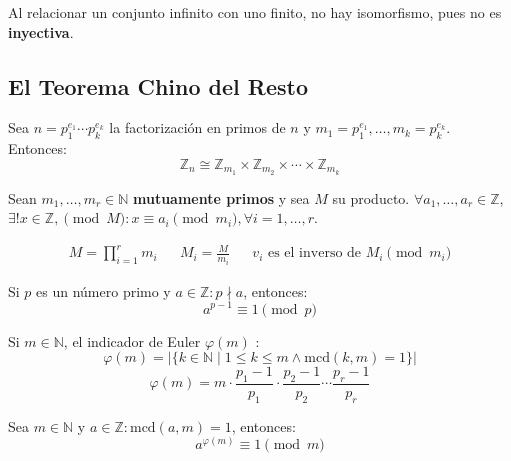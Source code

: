 \documentclass[12pt]{article}
\begin{document}
\begin{tcolorbox}[colback=yellow!15, title=Nota]
    Al relacionar un conjunto infinito con uno finito, no hay isomorfismo, pues no es \textbf{inyectiva}.
\end{tcolorbox}

\newpage

\subsection*{El Teorema Chino del Resto}

\begin{tcolorbox}[title=Isomorfismo]
Sea \( n = p_1^{e_1} \cdots p_k^{e_k} \) la factorización en primos de \( n \) y \( m_1 = p_1^{e_1}, \dots, m_k = p_k^{e_k} \). Entonces:
\[
\mathbb{Z}_n \cong \mathbb{Z}_{m_1} \times \mathbb{Z}_{m_2} \times \cdots \times \mathbb{Z}_{m_k}
\]
\end{tcolorbox}

\begin{tcolorbox}[title=Teorema Chino del Resto]
Sean \(m_1, \dots, m_r \in \mathbb{N}\) \textbf{mutuamente primos} y sea \(M\) su producto.
\( \forall a_1, \dots, a_r \in \mathbb{Z} \), \( \exists ! x \in \mathbb{Z}, \pmod{M} : x \equiv a_i \pmod{m_i}, \forall i = 1, \dots, r \).
\end{tcolorbox}

\begin{tcolorbox}[colback=yellow!15, title=Nota]
\begin{align*}
    M = \prod_{i=1}^r m_i && M_i = \frac{M}{m_i} && v_i \text{ es el inverso de } M_i \pmod{m_i}
\end{align*}
\end{tcolorbox}

\begin{tcolorbox}[title=Teorema de Fermat]    
Si \( p \) es un número primo y \( a \in \mathbb{Z} : p \nmid a \), entonces:
\[
a^{p-1} \equiv 1 \pmod{p}
\]
\end{tcolorbox}

\begin{tcolorbox}[title= Indicador de Euler]    
Si \( m \in \mathbb{N} \), el indicador de Euler \( \varphi(m) \) :
\[ \varphi(m) = |\{k \in \mathbb{N} \mid 1 \le k \le m \land \text{mcd}(k, m) = 1\}| \]
\[
    \varphi(m) = m \cdot \frac{p_1 - 1}{p_1} \cdot \frac{p_2 - 1}{p_2} \cdots \frac{p_r - 1}{p_r}
\]
\end{tcolorbox}

\begin{tcolorbox}[title= Teorema de Fermat-Euler]    
Sea \( m \in \mathbb{N} \) y \( a \in \mathbb{Z} : \text{mcd}(a, m) = 1\), entonces:
\[
a^{\varphi(m)} \equiv 1 \pmod{m}
\]
\end{tcolorbox}
\end{document}
